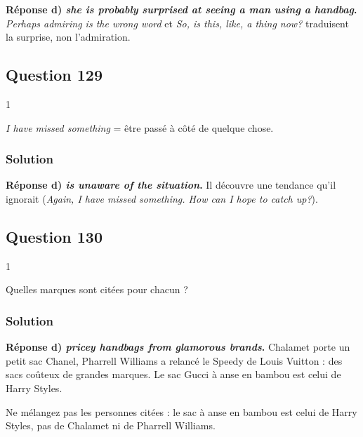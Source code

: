 \documentclass[11pt,a4paper]{article}
\begin{document}
\textbf{Réponse d) \emph{she is probably surprised at seeing a man using a handbag}.} \emph{Perhaps admiring is the wrong word} et \emph{So, is this, like, a thing now?} traduisent la surprise, non l'admiration.

\hypertarget{question-129}{%
\subsection{Question 129}\label{question-129}}

\begin{indication}{1}

\emph{I have missed something} = être passé à côté de quelque chose.

\end{indication}

\hypertarget{solution-128}{%
\subsubsection{Solution}\label{solution-128}}

\textbf{Réponse d) \emph{is unaware of the situation}.} Il découvre une tendance qu'il ignorait (\emph{Again, I have missed something. How can I hope to catch up?}).

\hypertarget{question-130}{%
\subsection{Question 130}\label{question-130}}

\begin{indication}{1}

Quelles marques sont citées pour chacun ?

\end{indication}

\hypertarget{solution-129}{%
\subsubsection{Solution}\label{solution-129}}

\textbf{Réponse d) \emph{pricey handbags from glamorous brands}.} Chalamet porte un petit sac Chanel, Pharrell Williams a relancé le Speedy de Louis Vuitton : des sacs coûteux de grandes marques. Le sac Gucci à anse en bambou est celui de Harry Styles.

\begin{piege}

Ne mélangez pas les personnes citées : le sac à anse en bambou est celui de Harry Styles, pas de Chalamet ni de Pharrell Williams.

\end{piege}
\end{document}
